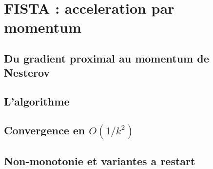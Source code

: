 %
%
%
\section{FISTA : acceleration par momentum}
\label{sec:fista}


\subsection{Du gradient proximal au momentum de Nesterov}

\subsection{L'algorithme}

\subsection{Convergence en $O(1/k^2)$}

\subsection{Non-monotonie et variantes a restart}
